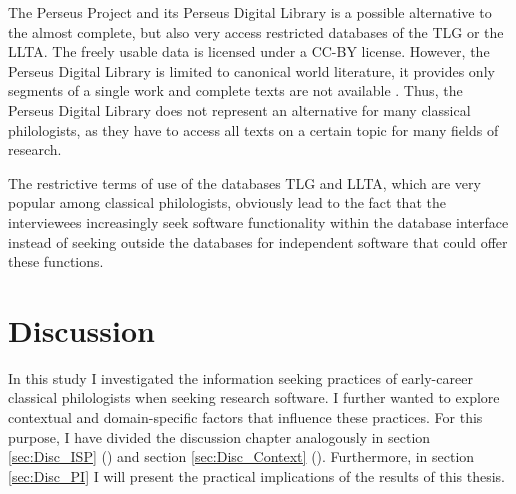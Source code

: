 \documentclass[12pt, a4paper, titlepage, oneside, abstract=true, toc=listof, toc=bibliography, BCOR=1cm]{scrreprt}
\begin{document}
{%
The Perseus Project and its Perseus Digital Library is a possible alternative to the almost complete, but also very access restricted databases of the TLG or the LLTA. The freely usable data is licensed under a CC-BY license. However, the Perseus Digital Library is limited to canonical world literature, it provides only segments of a single work and complete texts are not available \citep{Lang2018}. Thus, the Perseus Digital Library does not represent an alternative for many classical philologists, as they have to access all texts on a certain topic for many fields of research.

The restrictive terms of use of the databases TLG and LLTA, which are very popular among classical philologists, obviously lead to the fact that the interviewees increasingly seek software functionality within the database interface instead of seeking outside the databases for independent software that could offer these functions.

\chapter{Discussion}
\label{sec:discussion}
In this study I investigated the information seeking practices of early-career classical philologists when seeking research software. I further wanted to explore contextual and domain-specific factors that influence these practices. For this purpose, I have divided the discussion chapter analogously in section \ref{sec:Disc_ISP} () and section \ref{sec:Disc_Context} (). Furthermore, in section \ref{sec:Disc_PI} I will present the practical implications of the results of this thesis.

}
\end{document}
